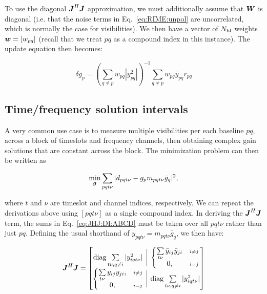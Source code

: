 \documentclass[useAMS,usenatbib]{mn2e}
\newcommand{\mat}[1]{{\bmath{#1}}}
\newcommand{\JJ}{\mat{J}} %
\newcommand{\JHJ}{\JJ^H\JJ} %
\begin{document}
To use the diagonal $\JJ^H\JJ$ approximation, we must additionally assume that $\mat{W}$ is diagonal (i.e. that the noise terms
in Eq.~\ref{eq:RIME:unpol} are uncorrelated, which is normally the case for visibilities). We then have a vector of $N_\mathrm{bl}$ weights
$\bmath{w}=[w_{pq}]$ (recall that we treat $pq$ as a compound index in this instance). The update equation then becomes:

\begin{equation}
\label{eq:JHJ:diag:W}
\delta g_p = \left( \sum\limits_{q\ne p} w_{pq} |y^2_{pq}| \right )^{-1} \sum\limits_{q\ne p} w_{pq} \bar{y}_{pq} r_{pq}
\end{equation}

\subsection{Time/frequency solution intervals}
\label{sec:DI:avg}

A very common use case is to measure multiple visibilities per each baseline $pq$, across a block of timeslots and frequency 
channels, then obtaining complex gain solutions that are constant across the block. The minimization problem can then
be written as

\begin{equation}
\label{eq:cal:DI:tf}
\min_{\bmath{g}}\sum_{pqt\nu}|d_{pqt\nu}-g_p m_{pqt\nu} \bar{g}_q|^2, 
\end{equation}

where $t$ and $\nu$ are timeslot and channel indices, respectively. We can repeat the derivations above using 
$[pqt\nu]$ as a single compound index. In deriving the $\JHJ$ term, the sums in Eq.~\ref{eq:JHJ:DI:ABCD}
must be taken over all $pqt\nu$ rather than just $pq$. Defining the usual shorthand of 
$y_{pqt\nu}=m_{pqt\nu}\bar{g}_q$, we then have:

\begin{equation}
\label{eq:JHJ:DI:tf}
\JJ^H \JJ = \Matrix{c@{~\bigg |~}c}{
\mathrm{diag} \sum\limits_{t\nu,q\ne i} |y^2_{iqt\nu}| & 
  \left \{ 
  \begin{array}{@{}cc@{}}
   \sum\limits_{t\nu} \bar{y}_{ij} \bar{y}_{ji} &{\scriptstyle i\ne j} \\
   0, &{\scriptstyle i=j}
  \end{array} \right .\\
  \left \{ 
  \begin{array}{@{}cc@{}}
   \sum\limits_{t\nu} y_{ij}y_{ji},&{\scriptstyle i\ne j} \\
   0, &{\scriptstyle i=j}
  \end{array} \right . 
  & \mathrm{diag} \sum\limits_{t\nu,q\ne i} |y^2_{iqt\nu}| 
}
\end{equation}
\end{document}
